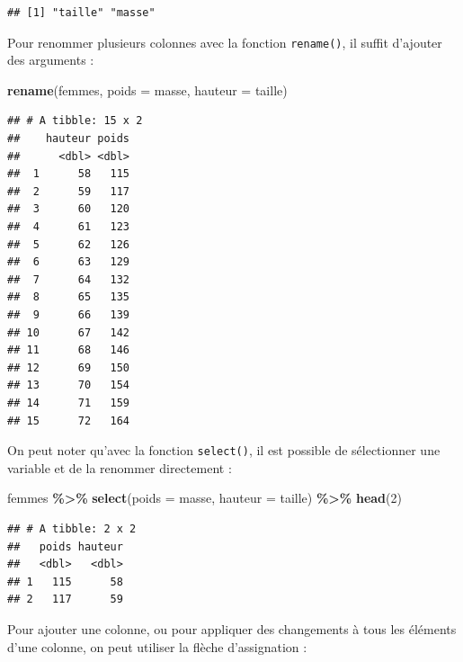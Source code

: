 \documentclass[
  11pt,
]{book}
\newenvironment{Shaded}{\begin{snugshade}}{\end{snugshade}}
\newcommand{\DataTypeTok}[1]{\textcolor[rgb]{0.13,0.29,0.53}{#1}}
\newcommand{\DecValTok}[1]{\textcolor[rgb]{0.00,0.00,0.81}{#1}}
\newcommand{\KeywordTok}[1]{\textcolor[rgb]{0.13,0.29,0.53}{\textbf{#1}}}
\newcommand{\NormalTok}[1]{#1}
\newcommand{\OperatorTok}[1]{\textcolor[rgb]{0.81,0.36,0.00}{\textbf{#1}}}
\newcommand{\StringTok}[1]{\textcolor[rgb]{0.31,0.60,0.02}{#1}}
\numberwithin{equation}{section}
\numberwithin{countremarque}{section}
\begin{document}
\begin{lstlisting}
## [1] "taille" "masse"
\end{lstlisting}

Pour renommer plusieurs colonnes avec la fonction \texttt{rename()}, il suffit d'ajouter des arguments :

\begin{Shaded}
\begin{Highlighting}[]
\KeywordTok{rename}\NormalTok{(femmes, }\DataTypeTok{poids =}\NormalTok{ masse, }\DataTypeTok{hauteur =}\NormalTok{ taille)}
\end{Highlighting}
\end{Shaded}

\begin{lstlisting}
## # A tibble: 15 x 2
##    hauteur poids
##      <dbl> <dbl>
##  1      58   115
##  2      59   117
##  3      60   120
##  4      61   123
##  5      62   126
##  6      63   129
##  7      64   132
##  8      65   135
##  9      66   139
## 10      67   142
## 11      68   146
## 12      69   150
## 13      70   154
## 14      71   159
## 15      72   164
\end{lstlisting}

On peut noter qu'avec la fonction \texttt{select()}, il est possible de sélectionner une variable et de la renommer directement :

\begin{Shaded}
\begin{Highlighting}[]
\NormalTok{femmes }\OperatorTok{\%\textgreater{}\%}\StringTok{ }
\StringTok{  }\KeywordTok{select}\NormalTok{(}\DataTypeTok{poids =}\NormalTok{ masse, }\DataTypeTok{hauteur =}\NormalTok{ taille) }\OperatorTok{\%\textgreater{}\%}\StringTok{ }
\StringTok{  }\KeywordTok{head}\NormalTok{(}\DecValTok{2}\NormalTok{)}
\end{Highlighting}
\end{Shaded}

\begin{lstlisting}
## # A tibble: 2 x 2
##   poids hauteur
##   <dbl>   <dbl>
## 1   115      58
## 2   117      59
\end{lstlisting}

Pour ajouter une colonne, ou pour appliquer des changements à tous les éléments d'une colonne, on peut utiliser la flèche d'assignation :
\end{document}
